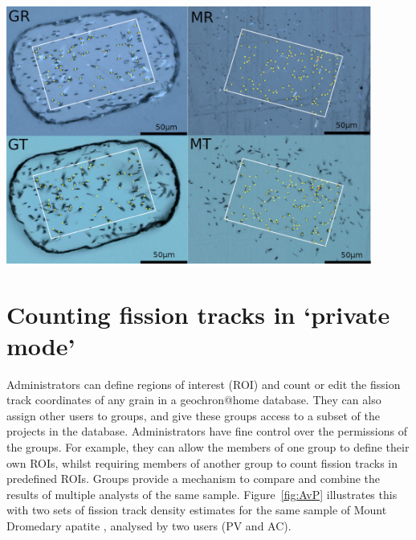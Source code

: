 \documentclass[gchron, manuscript]{copernicus}
\begin{document}
{ \centering \includegraphics[width=12cm]{EDM.jpg}
  \label{fig:EDM}
}%

\section{Counting fission tracks in `private mode'}\label{sec:private}

Administrators can define regions of interest (ROI) and count or edit
the fission track coordinates of any grain in a geochron@home
database. They can also assign other users to groups, and give these
groups access to a subset of the projects in the
database. Administrators have fine control over the permissions of the
groups. For example, they can allow the members of one group to define
their own ROIs, whilst requiring members of another group to count
fission tracks in predefined ROIs.  Groups provide a mechanism to
compare and combine the results of multiple analysts of the same
sample. Figure~\ref{fig:AvP} illustrates this with two sets of fission
track density estimates for the same sample of Mount Dromedary apatite
\citep{green1985b}, analysed by two users (PV and AC).\medskip
\end{document}
